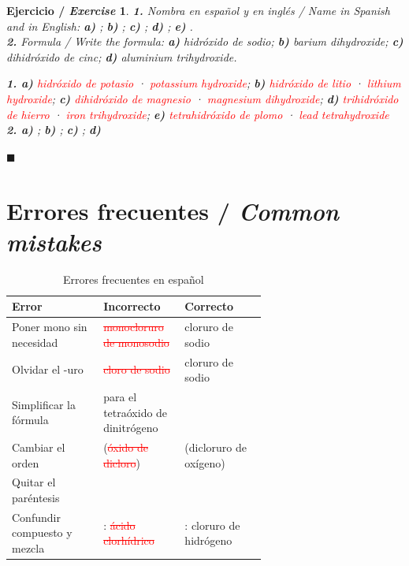 \documentclass[12pt]{article}
\theoremstyle{mygreennumbox}
\newtheorem{ejercicioT}{Ejercicio / \textit{Exercise}}[section]
\newenvironment{exercise}{\begin{eBoxmygreen}\begin{ejercicioT}}{\hfill{\color{mygreen}\tiny\ensuremath{\blacksquare}}\end{ejercicioT}\end{eBoxmygreen}}
\newcommand{\mal}[1]{\textcolor{red}{\sout{#1}}}
\newcommand{\en}[1]{\textit{#1}}
\begin{document}
\begin{exercise}
    \textbf{1.} Nombra en español y en inglés / \en{Name in Spanish and in English}: \textbf{a)} ; \textbf{b)} ; \textbf{c)} ; \textbf{d)} ; \textbf{e)} .\\
    \textbf{2.} Formula / \en{Write the formula}: \textbf{a)} hidróxido de sodio; \textbf{b)} \en{barium dihydroxide}; \textbf{c)} dihidróxido de cinc; \textbf{d)} \en{aluminium trihydroxide}.
    \begin{solu}
        \textbf{1. a)} \textcolor{red}{hidróxido de potasio} · \textcolor{red}{\en{potassium hydroxide}}; \textbf{b)} \textcolor{red}{hidróxido de litio} · \textcolor{red}{\en{lithium hydroxide}}; \textbf{c)} \textcolor{red}{dihidróxido de magnesio} · \textcolor{red}{\en{magnesium dihydroxide}}; \textbf{d)} \textcolor{red}{trihidróxido de hierro} · \textcolor{red}{\en{iron trihydroxide}}; \textbf{e)} \textcolor{red}{tetrahidróxido de plomo} · \textcolor{red}{\en{lead tetrahydroxide}}\\
        \textbf{2. a)} \textcolor{red}{}; \textbf{b)} \textcolor{red}{}; \textbf{c)} \textcolor{red}{}; \textbf{d)} \textcolor{red}{}
    \end{solu}
\end{exercise}

\section{Errores frecuentes / \en{Common mistakes}}

\begin{table}[H]
    \centering
    \caption{Errores frecuentes en español}
    \vspace{-5pt}
    \begin{tabular}{@{}l L{0.32\linewidth} L{0.32\linewidth}@{}}
        \toprule
        \textbf{Error} & \textbf{Incorrecto} & \textbf{Correcto} \\
        \midrule
        Poner mono sin necesidad & \mal{monocloruro de monosodio} & cloruro de sodio \\[3pt]
        Olvidar el -uro & \mal{cloro de sodio} & cloruro de sodio \\[3pt]
        Simplificar la fórmula & \mal{} para el tetraóxido de dinitrógeno &  \\[3pt]
        Cambiar el orden & \mal{} (\mal{óxido de dicloro}) &  (dicloruro de oxígeno) \\[3pt]
        Quitar el paréntesis & \mal{} &  \\[3pt]
        Confundir compuesto y mezcla & : \mal{ácido clorhídrico} & : cloruro de hidrógeno \\
        \bottomrule
    \end{tabular}
    \label{tab:errores_es}
\end{table}
\end{document}
